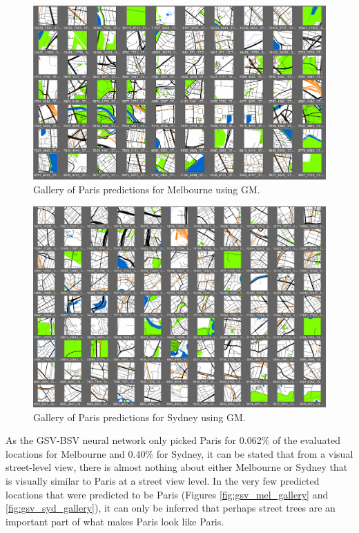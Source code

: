 \documentclass[sageh,times]{sagej}
\begin{document}
 \begin{figure}[!htbp]
 \centering    
 \includegraphics[scale=0.50]{Images/MelbourneLikeParis/Melbourne_maps_gallery.png} 
 \caption{Gallery of Paris predictions for Melbourne using GM.}    
  \label{fig:gm_mel_gallery}  
 \end{figure} 

\begin{figure}[!htbp]
\centering    
\includegraphics[scale=0.50]{Images/SydneyLikeParis/Sydney_maps_gallery.png} 
\caption{Gallery of Paris predictions for Sydney using GM.}    
 \label{fig:gm_syd_gallery}  
\end{figure} 

As the GSV-BSV neural network only picked Paris for 0.062\% of the evaluated locations for Melbourne and 0.40\% for Sydney, it can be stated that from a visual street-level view, there is almost nothing about either Melbourne or Sydney that is visually similar to Paris at a street view level. In the very few predicted locations that were predicted to be Paris (Figures \ref{fig:gsv_mel_gallery} and  \ref{fig:gsv_syd_gallery}), it can only be inferred that perhaps street trees are an important part of what makes Paris look like Paris.
\end{document}
